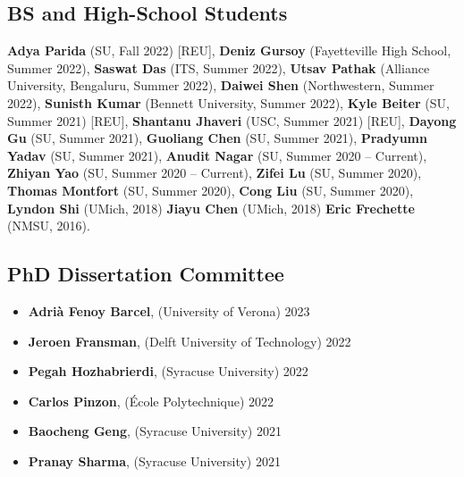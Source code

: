 \subsection*{BS and High-School Students}
  \textbf{Adya Parida} (SU, Fall 2022) [REU], 
  \textbf{Deniz Gursoy} (Fayetteville High School, Summer 2022), 
  \textbf{Saswat Das} (ITS, Summer 2022), 
  \textbf{Utsav Pathak} (Alliance University, Bengaluru, Summer 2022),
  \textbf{Daiwei Shen} (Northwestern, Summer 2022),
  \textbf{Sunisth Kumar} (Bennett University, Summer 2022),
  \textbf{Kyle Beiter} (SU, Summer 2021) [REU],  %
  \textbf{Shantanu Jhaveri} (USC, Summer 2021) [REU], %
  \textbf{Dayong Gu} (SU, Summer 2021),
  \textbf{Guoliang Chen} (SU, Summer 2021),
  \textbf{Pradyumn Yadav} (SU, Summer 2021),
  \textbf{Anudit Nagar} (SU, Summer 2020 -- Current), 
  \textbf{Zhiyan Yao} (SU, Summer 2020 -- Current),
  \textbf{Zifei Lu} (SU, Summer 2020),
  \textbf{Thomas Montfort} (SU, Summer 2020),
  \textbf{Cong Liu} (SU, Summer 2020),
  \textbf{Lyndon Shi} (UMich, 2018)
  \textbf{Jiayu Chen} (UMich, 2018)
  \textbf{Eric Frechette} (NMSU, 2016).

\medskip

\subsection*{PhD Dissertation Committee}
\begin{itemize}
  \item \textbf{Adrià Fenoy Barcel}, ({\sc University of Verona}) \hfill 2023
  \item \textbf{Jeroen Fransman}, ({\sc Delft University of Technology}) \hfill 2022
  \item \textbf{Pegah Hozhabrierdi}, ({\sc Syracuse University}) \hfill 2022
  \item \textbf{Carlos Pinzon}, ({\sc École Polytechnique}) \hfill 2022
  \item \textbf{Baocheng Geng}, ({\sc Syracuse University}) \hfill 2021
  \item \textbf{Pranay Sharma}, ({\sc Syracuse University}) \hfill 2021
\end{itemize}
\medskip